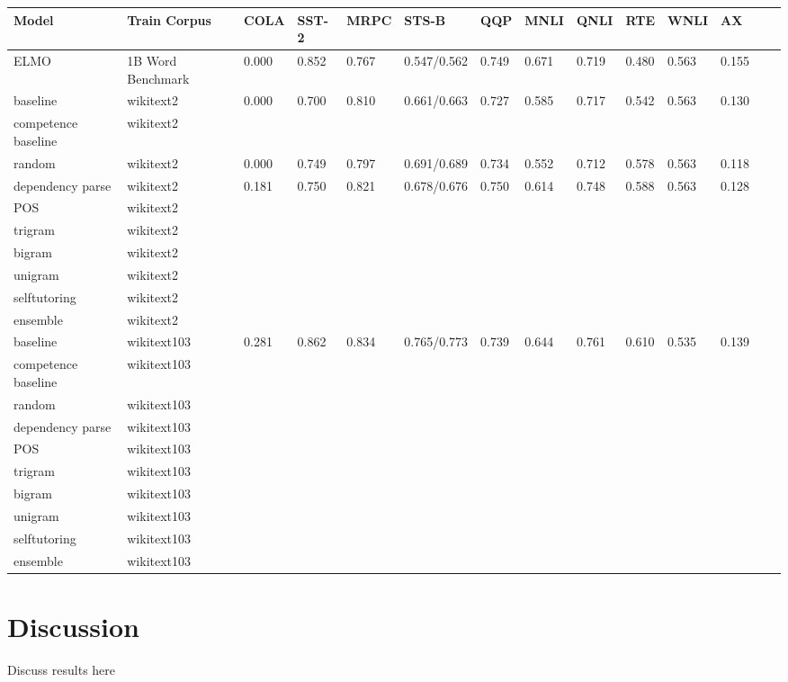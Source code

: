 \begin{table}[h!]
\tiny
\begin{tabular}{|l|l|l|l|l|l|l|l|l|l|l|l|l|l|} \hline
\textbf{Model} & \textbf{Train Corpus} & \textbf{COLA} & \textbf{SST-2} & \textbf{MRPC} & \textbf{STS-B} & \textbf{QQP}& \textbf{MNLI} & \textbf{QNLI} & \textbf{RTE} & \textbf{WNLI} & \textbf{AX} \\ \hline
ELMO \cite{Smith2019ContextualWR} & 1B Word Benchmark & 0.000 & 0.852 &  0.767 & 0.547/0.562 & 0.749 & 0.671 & 0.719 & 0.480 & 0.563 & 0.155 \\ \hline
baseline & wikitext2 & 0.000 & 0.700 & 0.810 & 0.661/0.663 & 0.727 & 0.585 & 0.717 & 0.542 & 0.563 & 0.130 \\ \hline
competence baseline & wikitext2 &  \\ \hline
random & wikitext2 & 0.000 & 0.749 & 0.797 & 0.691/0.689 & 0.734 & 0.552 & 0.712 & 0.578 & 0.563 & 0.118  \\ \hline
dependency parse & wikitext2 & 0.181 & 0.750  & 0.821 & 0.678/0.676 & 0.750 & 0.614 & 0.748 & 0.588 & 0.563 & 0.128 \\ \hline
POS & wikitext2 & \\ \hline
trigram & wikitext2 & \\ \hline
bigram & wikitext2 & \\ \hline
unigram & wikitext2 & \\ \hline
selftutoring & wikitext2 & \\\hline
ensemble & wikitext2 & \\ \hline
baseline & wikitext103 & 0.281 & 0.862 & 0.834 & 0.765/0.773 & 0.739& 0.644 & 0.761 &  0.610 & 0.535 & 0.139 \\\hline
competence baseline & wikitext103 &  \\ \hline
random & wikitext103 & \\ \hline
dependency parse & wikitext103 & \\ \hline
POS & wikitext103 & \\ \hline
trigram & wikitext103 & \\ \hline
bigram & wikitext103 & \\ \hline
unigram & wikitext103 & \\ \hline
selftutoring & wikitext103 & \\\hline
ensemble & wikitext103 & \\ \hline

\end{tabular}
\label{table:corpuscurriculaGLUE}
\end{table}
\section{Discussion}
Discuss results here